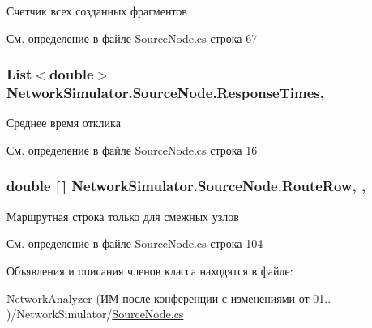 Счетчик всех созданных фрагментов 



См. определение в файле Source\+Node.\+cs строка 67

\subsubsection[{\texorpdfstring{Response\+Times}{ResponseTimes}}]{\setlength{\rightskip}{0pt plus 5cm}List$<$double$>$ Network\+Simulator.\+Source\+Node.\+Response\+Times\hspace{0.3cm}{\ttfamily [get]}, {}}\hypertarget{class_network_simulator_1_1_source_node_ad631f434c90a58a65f71945f5cecd82d}{}\label{class_network_simulator_1_1_source_node_ad631f434c90a58a65f71945f5cecd82d}


Среднее время отклика 



См. определение в файле Source\+Node.\+cs строка 16

\subsubsection[{\texorpdfstring{Route\+Row}{RouteRow}}]{\setlength{\rightskip}{0pt plus 5cm}double \mbox{[}$\,$\mbox{]} Network\+Simulator.\+Source\+Node.\+Route\+Row\hspace{0.3cm}{\ttfamily [get]}, {\ttfamily [set]}, {\ttfamily [private]}}\hypertarget{class_network_simulator_1_1_source_node_aa06f15bdfd1627ca01d35acb9bae863b}{}\label{class_network_simulator_1_1_source_node_aa06f15bdfd1627ca01d35acb9bae863b}


Маршрутная строка только для смежных узлов 



См. определение в файле Source\+Node.\+cs строка 104



Объявления и описания членов класса находятся в файле\+:\begin{DoxyCompactItemize}
\item 
Network\+Analyzer (ИМ после конференции  с изменениями от 01.. )/\+Network\+Simulator/\hyperlink{_source_node_8cs}{Source\+Node.\+cs}\end{DoxyCompactItemize}
